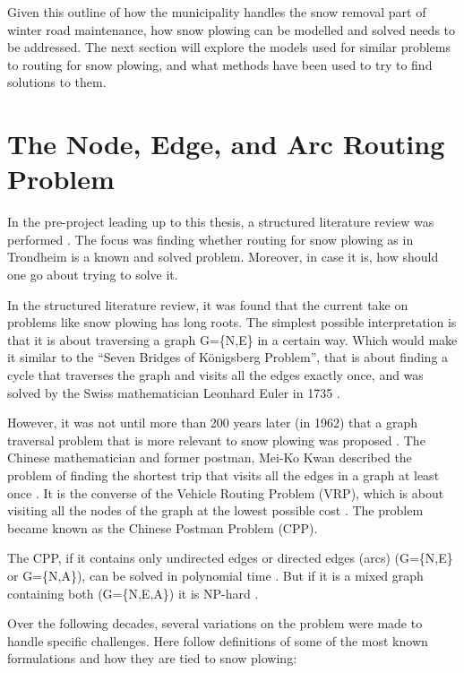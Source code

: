 
Given this outline of how the municipality handles the snow removal part of winter road maintenance, how snow plowing can be modelled and solved needs to be addressed. The next section will explore the models used for similar problems to routing for snow plowing, and what methods have been used to try to find solutions to them.


\section{The Node, Edge, and Arc Routing Problem}
\label{the_nearp}

In the pre-project leading up to this thesis, a structured literature review was performed \citep{forprosjektet}. The focus was finding whether routing for snow plowing as in Trondheim is a known and solved problem. Moreover, in case it is, how should one go about trying to solve it.

In the structured literature review, it was found that the current take on problems like snow plowing has long roots. The simplest possible interpretation is that it is about traversing a graph G=\{N,E\} in a certain way. Which would make it similar to the “Seven Bridges of Königsberg Problem”, that is about finding a cycle that traverses the graph and visits all the edges exactly once, and was solved by the Swiss mathematician Leonhard Euler in 1735 \citep{eulerBridges}.

However, it was not until more than 200 years later (in 1962) that a graph traversal problem that is more relevant to snow plowing was proposed \citep{wohlk2008decade}. The Chinese mathematician and former postman, Mei-Ko Kwan described the problem of finding the shortest trip that visits all the edges in a graph at least once \citep{meiKoKwanCPP}. It is the converse of the Vehicle Routing Problem (VRP), which is about visiting all the nodes of the graph at the lowest possible cost \citep{laporte1992vehicle}. The problem became known as the Chinese Postman Problem (CPP).

The CPP, if it contains only undirected edges or directed edges (arcs) (G=\{N,E\} or G=\{N,A\}), can be solved in polynomial time \citep{wohlk2008decade}. But if it is a mixed graph containing both (G=\{N,E,A\}) it is NP-hard \citep{wohlk2008decade}.

Over the following decades, several variations on the problem were made to handle specific challenges. Here follow definitions of some of the most known formulations and how they are tied to snow plowing:

